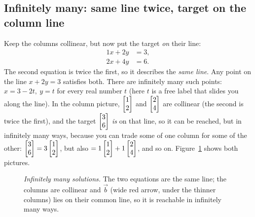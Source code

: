 \subsection{Infinitely many: same line twice, target on the column line}

Keep the columns collinear, but now put the target \emph{on} their line:
\begin{equation}
  \label{ch06:infsol}
  \begin{aligned}
    1x + 2y &= 3,\\
    2x + 4y &= 6.
  \end{aligned}
\end{equation}
The second equation is twice the first, so it describes the \emph{same
line}. Any point on the line $x+2y=3$ satisfies both. There are
infinitely many such points: $x=3-2t,\ y=t$ for every real number $t$ (here
$t$ is a free label that slides you along the line). In the
column picture, $\begin{bmatrix}1\\2\end{bmatrix}$ and $\begin{bmatrix}2\\4\end{bmatrix}$ are collinear (the second
is twice the first), and the target $\begin{bmatrix}3\\6\end{bmatrix}$ \emph{is} on that line,
so it can be reached, but in infinitely many ways, because you can trade
some of one column for some of the other: $\begin{bmatrix}3\\6\end{bmatrix}=3\begin{bmatrix}1\\2\end{bmatrix}$,
but also $=1\begin{bmatrix}1\\2\end{bmatrix}+1\begin{bmatrix}2\\4\end{bmatrix}$, and so on. Figure~\ref{ch06:inf}
shows both pictures.

\begin{figure}[H]
\centering
{}
\caption{\emph{Infinitely many solutions.} The two equations are the same
line; the columns are collinear and $\vec b$ (wide red arrow, under the thinner columns) lies on
their common line, so it is reachable in infinitely many ways.}
\label{ch06:inf}
\end{figure}

